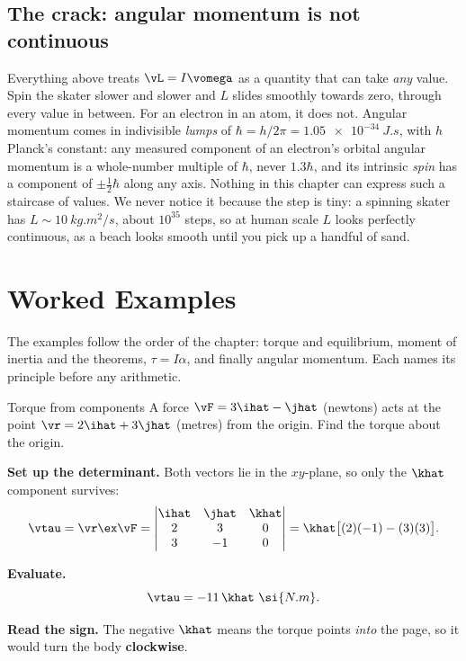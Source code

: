 \subsection{The crack: angular momentum is not continuous}

Everything above treats $\vL=I\vomega$ as a quantity that can take \emph{any} value. Spin the skater
slower and slower and $L$ slides smoothly towards zero, through every value in between. For an electron in
an atom, it does not. Angular momentum comes in indivisible \emph{lumps} of
$\hbar=h/2\pi=\SI{1.05e-34}{J.s}$, with $h$ Planck's constant: any measured component of an electron's
orbital angular momentum is a whole-number multiple of $\hbar$, never $1.3\hbar$, and its intrinsic
\emph{spin} has a component of $\pm\tfrac12\hbar$ along any axis. Nothing in this chapter can express such
a staircase of values. We never notice it because the step is tiny: a
spinning skater has $L\sim\SI{10}{kg.m^2/s}$, about $10^{35}$ steps, so at human scale $L$ looks
perfectly continuous, as a beach looks smooth until you pick up a handful of sand.


\section{Worked Examples}

The examples follow the order of the chapter: torque and equilibrium, moment of inertia and the
theorems, $\tau=I\alpha$, and finally angular momentum. Each names its principle before any arithmetic.

\begin{exbox}{Torque from components}
A force $\vF=3\ihat-\jhat$ (newtons) acts at the point $\vr=2\ihat+3\jhat$ (metres) from the origin. Find
the torque about the origin.

 \textbf{Set up the determinant.} Both vectors lie in the $xy$-plane, so only the $\khat$
component survives:
\[
\vtau=\vr\ex\vF=\begin{vmatrix}\ihat&\jhat&\khat\\ 2&3&0\\ 3&-1&0\end{vmatrix}
=\khat\big[(2)(-1)-(3)(3)\big].
\]

 \textbf{Evaluate.}
\[
\vtau=-11\,\khat\ \si{N.m}.
\]

 \textbf{Read the sign.} The negative $\khat$ means the torque points \emph{into} the page, so
it would turn the body \textbf{clockwise}. 
\end{exbox}

